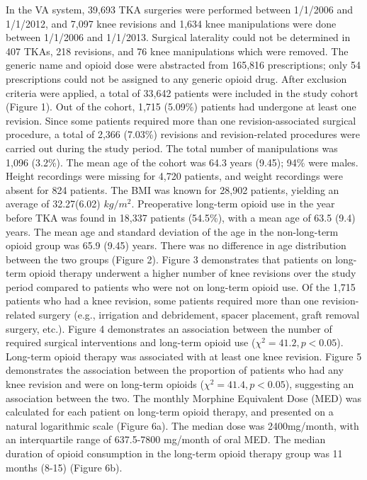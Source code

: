 \documentclass[a4paper]{article}
\begin{document}
In the VA system, 39,693 TKA surgeries were performed between 1/1/2006 and 1/1/2012, and 7,097 knee revisions and 1,634 knee manipulations were done between 1/1/2006 and 1/1/2013. Surgical laterality could not be determined in 407 TKAs, 218 revisions, and 76 knee manipulations which were removed. The generic name and opioid dose were abstracted from 165,816 prescriptions; only 54 prescriptions could not be assigned to any generic opioid drug. After exclusion criteria were applied, a total of 33,642 patients were included in the study cohort (Figure 1). Out of the cohort, 1,715 (5.09\%) patients had undergone at least one revision. Since some patients required more than one revision-associated surgical procedure, a total of 2,366 (7.03\%) revisions and revision-related procedures were carried out during the study period. The total number of manipulations was 1,096 (3.2\%). The mean age of the cohort was 64.3 years (9.45); 94\% were males. Height recordings were missing for 4,720 patients, and weight recordings were absent for 824 patients. The BMI was known for 28,902 patients, yielding an average of 32.27(6.02)
 $kg/m^2$.
Preoperative long-term opioid use in the year before TKA was found in 18,337 patients (54.5\%), with a  mean  age of 63.5 (9.4) years. The mean age and standard deviation of the age in the non-long-term opioid group was 65.9 (9.45) years. There was no difference in age distribution between the two groups (Figure 2).
Figure 3 demonstrates that patients on long-term opioid therapy underwent a higher number of knee revisions over the study period compared to patients who were not on long-term opioid use. Of the 1,715 patients who had a knee revision, some patients required more than one revision-related surgery (e.g., irrigation and debridement, spacer placement, graft removal surgery, etc.). Figure 4 demonstrates an association between the number of required surgical interventions and long-term opioid use ($\chi^2 = 41.2, p<0.05$). Long-term opioid therapy  was associated with at least one knee revision. Figure 5 demonstrates the association between the proportion of patients who had any knee revision and were on long-term opioids ($\chi^2= 41.4, p<0.05$), suggesting an association between the two.
The monthly Morphine Equivalent Dose (MED) was calculated for each patient on long-term opioid therapy, and presented on a natural logarithmic scale (Figure 6a). The median dose was 2400mg/month, with an interquartile range of 637.5-7800 mg/month of oral MED. The median duration of opioid consumption in the long-term opioid therapy group was 11 months (8-15) (Figure 6b).
\end{document}

